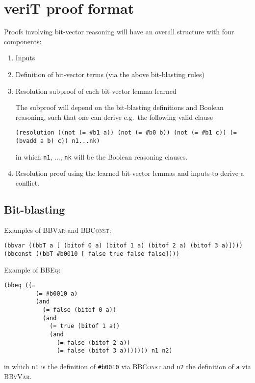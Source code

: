 \documentclass{article}
\begin{document}
\section{veriT proof format}

Proofs involving bit-vector reasoning will have an overall structure with four
components:
\begin{enumerate}
  \item Inputs
  \item Definition of bit-vector terms (via the above bit-blasting rules)
  \item Resolution subproof of each bit-vector lemma learned

  The subproof will depend on the bit-blasting definitions and Boolean reasoning,
  such that one can derive e.g.\ the following valid clause
\begin{verbatim}
(resolution ((not (= #b1 a)) (not (= #b0 b)) (not (= #b1 c)) (= (bvadd a b) c)) n1...nk)
\end{verbatim}
  in which \texttt{n1}, ..., \texttt{nk} will be the Boolean reasoning clauses.

  \item Resolution proof using the learned bit-vector lemmas and inputs to
  derive a conflict.
\end{enumerate}


\subsection{Bit-blasting}

Examples of \textsc{BBVar} and \textsc{BBConst}:

\begin{verbatim}
(bbvar ((bbT a [ (bitof 0 a) (bitof 1 a) (bitof 2 a) (bitof 3 a)])))
(bbconst ((bbT #b0010 [ false true false false])))
\end{verbatim}

\noindent
Example of \textsc{BBEq}:

\begin{verbatim}
(bbeq ((=
         (= #b0010 a)
         (and
           (= false (bitof 0 a))
           (and
             (= true (bitof 1 a))
             (and
               (= false (bitof 2 a))
               (= false (bitof 3 a))))))) n1 n2)
\end{verbatim}
in which \texttt{n1} is the definition of \texttt{\#b0010} via \textsc{BBConst}
and \texttt{n2} the definition of \texttt{a} via \textsc{BBvVar}.


\end{document}
